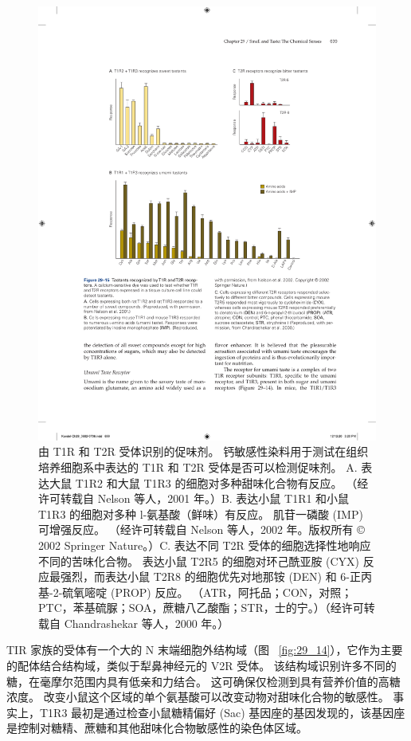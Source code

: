 \begin{figure}[htbp]
	\centering
	\includegraphics[width=0.8\linewidth]{chap29/fig_29_15}
	\caption{由 T1R 和 T2R 受体识别的促味剂。 钙敏感性染料用于测试在组织培养细胞系中表达的 T1R 和 T2R 受体是否可以检测促味剂。 A. 表达大鼠 T1R2 和大鼠 T1R3 的细胞对多种甜味化合物有反应。 （经许可转载自 Nelson 等人，2001 年。）B. 表达小鼠 T1R1 和小鼠 T1R3 的细胞对多种 l-氨基酸（鲜味）有反应。 肌苷一磷酸 (IMP) 可增强反应。 （经许可转载自 Nelson 等人，2002 年。版权所有 © 2002 Springer Nature。）C. 表达不同 T2R 受体的细胞选择性地响应不同的苦味化合物。 表达小鼠 T2R5 的细胞对环己酰亚胺 (CYX) 反应最强烈，而表达小鼠 T2R8 的细胞优先对地那铵 (DEN) 和 6-正丙基-2-硫氧嘧啶 (PROP) 反应。 （ATR，阿托品；CON，对照；PTC，苯基硫脲；SOA，蔗糖八乙酸酯；STR，士的宁。）（经许可转载自 Chandrashekar 等人，2000 年。）}
	\label{fig:29_15}
\end{figure}


TIR 家族的受体有一个大的 N 末端细胞外结构域（图 ~\ref{fig:29_14}），它作为主要的配体结合结构域，类似于犁鼻神经元的 V2R 受体。
该结构域识别许多不同的糖，在毫摩尔范围内具有低亲和力结合。
这可确保仅检测到具有营养价值的高糖浓度。
改变小鼠这个区域的单个氨基酸可以改变动物对甜味化合物的敏感性。
事实上，T1R3 最初是通过检查小鼠糖精偏好 (Sac) 基因座的基因发现的，该基因座是控制对糖精、蔗糖和其他甜味化合物敏感性的染色体区域。


